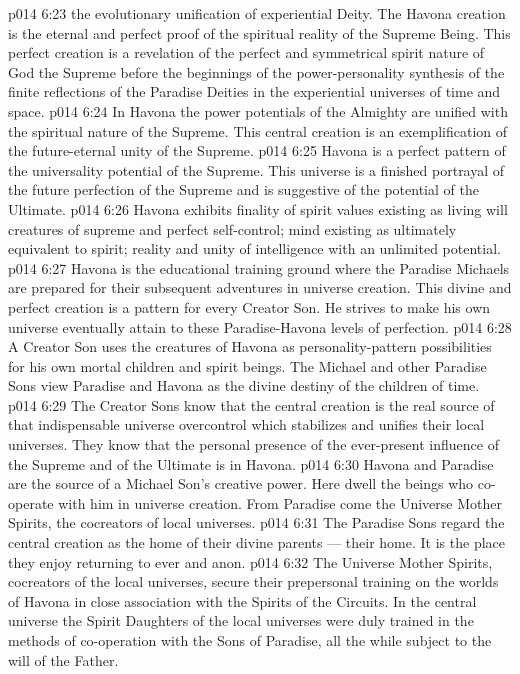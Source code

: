\vs p014 6:23 \bibnobreakspace {} the evolutionary unification of experiential Deity. The Havona creation is the eternal and perfect proof of the spiritual reality of the Supreme Being. This perfect creation is a revelation of the perfect and symmetrical spirit nature of God the Supreme before the beginnings of the power\hyp{}personality synthesis of the finite reflections of the Paradise Deities in the experiential universes of time and space.
\vs p014 6:24 In Havona the power potentials of the Almighty are unified with the spiritual nature of the Supreme. This central creation is an exemplification of the future\hyp{}eternal unity of the Supreme.
\vs p014 6:25 Havona is a perfect pattern of the universality potential of the Supreme. This universe is a finished portrayal of the future perfection of the Supreme and is suggestive of the potential of the Ultimate.
\vs p014 6:26 Havona exhibits finality of spirit values existing as living will creatures of supreme and perfect self\hyp{}control; mind existing as ultimately equivalent to spirit; reality and unity of intelligence with an unlimited potential.
\vs p014 6:27 \bibnobreakspace {} Havona is the educational training ground where the Paradise Michaels are prepared for their subsequent adventures in universe creation. This divine and perfect creation is a pattern for every Creator Son. He strives to make his own universe eventually attain to these Paradise\hyp{}Havona levels of perfection.
\vs p014 6:28 A Creator Son uses the creatures of Havona as personality\hyp{}pattern possibilities for his own mortal children and spirit beings. The Michael and other Paradise Sons view Paradise and Havona as the divine destiny of the children of time.
\vs p014 6:29 The Creator Sons know that the central creation is the real source of that indispensable universe overcontrol which stabilizes and unifies their local universes. They know that the personal presence of the ever\hyp{}present influence of the Supreme and of the Ultimate is in Havona.
\vs p014 6:30 Havona and Paradise are the source of a Michael Son’s creative power. Here dwell the beings who co\hyp{}operate with him in universe creation. From Paradise come the Universe Mother Spirits, the cocreators of local universes.
\vs p014 6:31 The Paradise Sons regard the central creation as the home of their divine parents --- their home. It is the place they enjoy returning to ever and anon.
\vs p014 6:32 \bibnobreakspace {} The Universe Mother Spirits, cocreators of the local universes, secure their prepersonal training on the worlds of Havona in close association with the Spirits of the Circuits. In the central universe the Spirit Daughters of the local universes were duly trained in the methods of co\hyp{}operation with the Sons of Paradise, all the while subject to the will of the Father.
